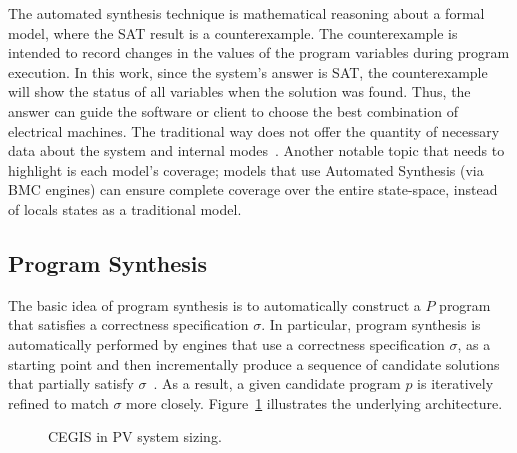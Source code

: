 \documentclass[10pt,journal,compsoc]{IEEEtran}
\begin{document}
The automated synthesis technique is mathematical reasoning about a formal model, where the SAT result is a counterexample. The counterexample is intended to record changes in the values of the program variables during program execution. In this work, since the system's answer is SAT, the counterexample will show the status of all variables when the solution was found. Thus, the answer can guide the software or client to choose the best combination of electrical machines. The traditional way does not offer the quantity of necessary data about the system and internal modes~\cite{Benatiallah2017,Pradhan,Swarnkar}. Another notable topic that needs to highlight is each model's coverage; models that use Automated Synthesis (via BMC engines) can ensure complete coverage over the entire state-space, instead of locals states as a traditional model. 

\subsection{Program Synthesis}
\label{sec:ProgramSynthesis}

The basic idea of program synthesis is to automatically construct a $P$ program that satisfies a correctness specification $\sigma$. In particular, program synthesis is automatically performed by engines that use a correctness specification $\sigma$, as a starting point and then incrementally produce a sequence of candidate solutions that partially satisfy $\sigma$~\cite{Abateetal2017}. As a result, a given candidate program $p$ is iteratively refined to match $\sigma$ more closely. Figure~\ref{Counter-Example-Guided-Inductive-Synthesis} illustrates the underlying architecture. 
%
\begin{figure}[h]
\begin{center}
\end{center}
	\caption{CEGIS in PV system sizing.}
	\label{Counter-Example-Guided-Inductive-Synthesis}
\end{figure}
\end{document}

